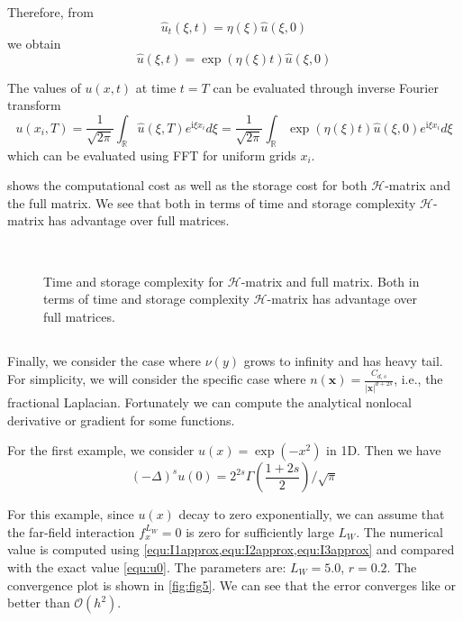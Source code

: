 \documentclass[10pt,a4paper]{article}
\newcommand{\ii}[0]{\mathrm{i}}
\newcommand{\RR}[0]{\mathbb{R}}
\newcommand{\bx}[0]{\mathbf{x}}
\theoremstyle{definition}
\begin{document}
Therefore, from 
\begin{equation}
	\hat u_t(\xi, t) = \eta(\xi) \hat u(\xi, 0)
\end{equation}
we obtain
\begin{equation}
	\hat u(\xi, t) = \exp(\eta(\xi)t)\hat u(\xi, 0)
\end{equation}

The values of $u(x,t)$ at time $t=T$ can be evaluated through inverse Fourier transform
\begin{equation}
	u(x_i, T) = \frac{1}{\sqrt{2\pi}}\int_\RR \hat u(\xi, T) e^{\ii \xi x_i} d\xi  = \frac{1}{\sqrt{2\pi}}\int_\RR  \exp(\eta(\xi)t)\hat u(\xi, 0) e^{\ii \xi x_i} d\xi 
\end{equation}
which can be evaluated using FFT for uniform grids $x_i$. 

 shows the computational cost as well as the storage cost for both $\mathcal{H}$-matrix and the full matrix. We see that both in terms of time and storage complexity $\mathcal{H}$-matrix has advantage over full matrices.

\begin{figure}[htpb]
\centering
\scalebox{0.3}{}~
\scalebox{0.3}{}

\caption{Time and storage complexity for $\mathcal{H}$-matrix and full matrix. Both in terms of time and storage complexity $\mathcal{H}$-matrix has advantage over full matrices.}
\label{fig:s}
\end{figure}

\subsection{}

Finally, we consider the case where $\nu(y)$ grows to infinity and has heavy tail. For simplicity, we will consider the specific case where $n(\bx) = \frac{C_{d, s}}{|\bx|^{d+2s}}$, i.e., the fractional Laplacian. Fortunately we can compute  the analytical nonlocal derivative or gradient for some functions. 

For the first example, we consider $u(x)=\exp(-x^2)$ in 1D. Then we have
\begin{equation}\label{equ:u0}
	(-\Delta)^s u(0) = 2^{2s}\Gamma\left( \frac{1+2s}{2} \right)/\sqrt{\pi}
\end{equation}

For this example, since $u(x)$ decay to zero exponentially, we can assume that the far-field interaction $f^{L_W}_x=0$ is zero for sufficiently large $L_W$. The numerical value is computed using \cref{equ:I1approx,equ:I2approx,equ:I3approx} and compared with the exact value \cref{equ:u0}. The parameters are: $L_W=5.0$, $r=0.2$. The convergence plot is shown in \cref{fig:fig5}. We can see that the error converges like or better than $\mathcal{O}(h^2)$. 
\end{document}
